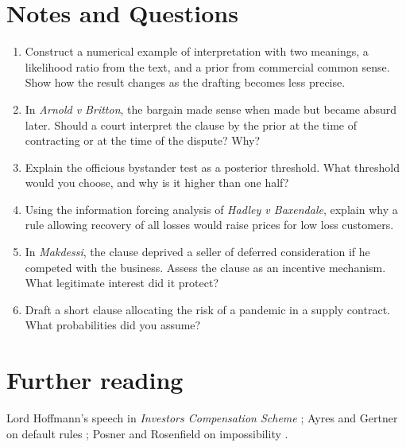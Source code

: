\section*{Notes and Questions}
\begin{enumerate}[label=\arabic*.]
\item Construct a numerical example of interpretation with two meanings, a likelihood ratio from the text, and a prior from commercial common sense. Show how the result changes as the drafting becomes less precise.
\item In \emph{Arnold v Britton}, the bargain made sense when made but became absurd later. Should a court interpret the clause by the prior at the time of contracting or at the time of the dispute? Why?
\item Explain the officious bystander test as a posterior threshold. What threshold would you choose, and why is it higher than one half?
\item Using the information forcing analysis of \emph{Hadley v Baxendale}, explain why a rule allowing recovery of all losses would raise prices for low loss customers.
\item In \emph{Makdessi}, the clause deprived a seller of deferred consideration if he competed with the business. Assess the clause as an incentive mechanism. What legitimate interest did it protect?
\item Draft a short clause allocating the risk of a pandemic in a supply contract. What probabilities did you assume?
\end{enumerate}

\section*{Further reading}
Lord Hoffmann's speech in \emph{Investors Compensation Scheme} \citep{ics1998}; Ayres and Gertner on default rules \citep{ayres1989}; Posner and Rosenfield on impossibility \citep{posner1977}.
